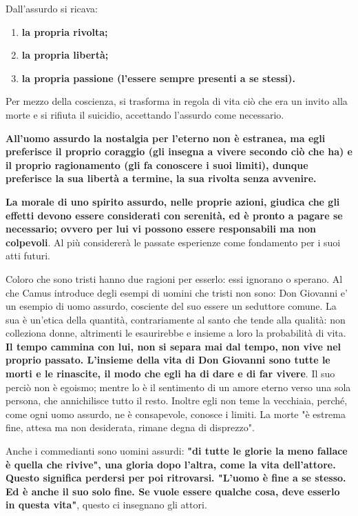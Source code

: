 \documentclass[a4paper,12pt,oneside]{article}%
\begin{document}
Dall'assurdo si ricava:
\begin{enumerate}
	\item  \textbf{la propria rivolta;}
	\item  \textbf{la propria libertà;}
	\item  \textbf{la propria passione (l'essere sempre presenti a
	se stessi).}
\end{enumerate}


Per mezzo della coscienza, si trasforma in regola
di vita ciò che era un invito alla morte e si
rifiuta il suicidio, accettando l'assurdo come
necessario.

\textbf{All'uomo assurdo la nostalgia per l'eterno non
è estranea, ma egli preferisce il proprio coraggio
(gli insegna a vivere secondo ciò che ha) e il proprio
ragionamento (gli fa conoscere i suoi limiti), dunque
preferisce la sua libertà a termine, la sua rivolta
senza avvenire.}

\textbf{La morale di uno spirito assurdo, nelle proprie
azioni, giudica che gli effetti devono essere
considerati con serenità, ed è pronto a pagare
se necessario; ovvero per lui vi possono essere
responsabili ma non colpevoli}. Al più considererà
le passate esperienze come fondamento per i
suoi atti futuri.

Coloro che sono tristi hanno due ragioni per esserlo:
essi ignorano o sperano. Al che Camus introduce degli esempi di uomini che tristi non sono:
Don Giovanni e' un esempio di uomo assurdo,
cosciente del suo essere un seduttore comune. La
sua è un'etica della quantità, contrariamente
al santo che tende alla qualità: non colleziona
donne, altrimenti le esaurirebbe e insieme a
loro la probabilità di vita. \textbf{Il tempo cammina
con lui, non si separa mai dal tempo, non vive nel
proprio passato.
L'insieme della vita di Don Giovanni sono tutte
le morti e le rinascite, il modo che egli ha di
dare e di far vivere}. Il suo perciò non è egoismo;
mentre lo è il sentimento di un amore eterno
verso una sola persona, che annichilisce tutto il
resto. Inoltre egli non teme la vecchiaia, perché,
come ogni uomo assurdo, ne è consapevole, conosce
i limiti. La morte "è estrema fine, attesa ma non desiderata,
rimane degna di disprezzo".

Anche i commedianti sono uomini assurdi: \textbf{"di tutte le glorie la meno fallace è quella che
rivive", una gloria dopo l'altra, come la vita
dell'attore. Questo significa perdersi per poi
ritrovarsi.
"L'uomo è fine a se stesso. Ed è anche il suo solo
fine. Se vuole essere qualche cosa, deve esserlo in
questa vita"}, questo ci insegnano gli attori.
\end{document}
